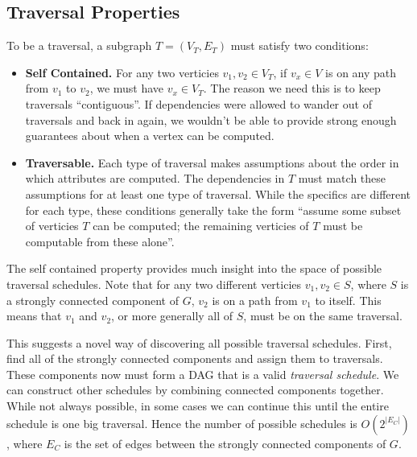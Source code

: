 \documentclass[10pt]{article}
\begin{document}
\subsection{Traversal Properties}
To be a traversal, a subgraph $T = (V_T, E_T)$ must satisfy two conditions:
\begin{itemize}
    \item \textbf{Self Contained.} For any two verticies $v_1, v_2 \in V_T$, if $v_x \in V$ is on any path from $v_1$ to $v_2$, we must have $v_x \in V_T$. The reason we need this is to keep traversals ``contiguous''. If dependencies were allowed to wander out of traversals and back in again, we wouldn't be able to provide strong enough guarantees about when a vertex can be computed.
    \item \textbf{Traversable.} Each type of traversal makes assumptions about the order in which attributes are computed. The dependencies in $T$ must match these assumptions for at least one type of traversal. While the specifics are different for each type, these conditions generally take the form ``assume some subset of verticies $T$ can be computed; the remaining verticies of $T$ must be computable from these alone''.
\end{itemize}

The self contained property provides much insight into the space of possible traversal schedules. Note that for any two different verticies $v_1,v_2 \in S$, where $S$ is a strongly connected component of $G$, $v_2$ is on a path from $v_1$ to itself. This means that $v_1$ and $v_2$, or more generally all of $S$, must be on the same traversal. 

This suggests a novel way of discovering all possible traversal schedules. First, find all of the strongly connected components and assign them to traversals. These components now must form a DAG that is a valid \emph{traversal schedule}. We can construct other schedules by combining connected components together. While not always possible, in some cases we can continue this until the entire schedule is one big traversal. Hence the number of possible schedules is
$O(2^{|E_C|})$, where $E_C$ is the set of edges between the strongly connected components of $G$.
\end{document}
